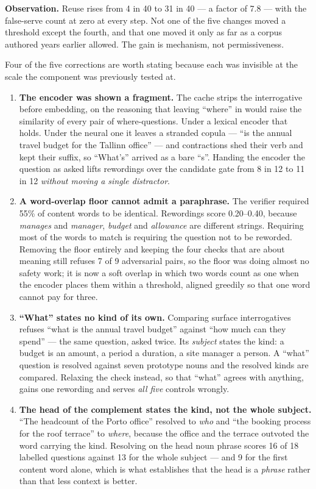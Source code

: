 \documentclass[11pt,a4paper]{article}
\newcommand{\obs}[1]{%
  \par\vspace{2pt}
  \noindent\begin{tcolorbox}[colback=soft,colframe=accent,boxrule=0pt,
    leftrule=2.2pt,arc=0pt,left=7pt,right=5pt,top=4pt,bottom=4pt,breakable]
  \small\textbf{Observation.} #1
  \end{tcolorbox}\par\vspace{2pt}}
\begin{document}
\obs{Reuse rises from 4 in 40 to 31 in 40 --- a factor of 7.8 --- with the
false-serve count at zero at every step. Not one of the five changes moved a
threshold except the fourth, and that one moved it only as far as a corpus
authored years earlier allowed. The gain is mechanism, not permissiveness.}

Four of the five corrections are worth stating because each was invisible at the
scale the component was previously tested at.

\begin{enumerate}
\item \textbf{The encoder was shown a fragment.} The cache strips the
interrogative before embedding, on the reasoning that leaving ``where'' in would
raise the similarity of every pair of where-questions. Under a lexical encoder
that holds. Under the neural one it leaves a stranded copula --- ``is the annual
travel budget for the Tallinn office'' --- and contractions shed their verb and
kept their suffix, so ``What's'' arrived as a bare ``s''. Handing the encoder the
question as asked lifts rewordings over the candidate gate from 8 in 12 to 11 in
12 \emph{without moving a single distractor}.

\item \textbf{A word-overlap floor cannot admit a paraphrase.} The verifier
required 55\% of content words to be identical. Rewordings score 0.20--0.40,
because \emph{manages} and \emph{manager}, \emph{budget} and \emph{allowance} are
different strings. Requiring most of the words to match is requiring the question
not to be reworded. Removing the floor entirely and keeping the four checks that
are about meaning still refuses 7 of 9 adversarial pairs, so the floor was doing
almost no safety work; it is now a soft overlap in which two words count as one
when the encoder places them within a threshold, aligned greedily so that one
word cannot pay for three.

\item \textbf{``What'' states no kind of its own.} Comparing surface
interrogatives refuses ``what is the annual travel budget'' against ``how much
can they spend'' --- the same question, asked twice. Its \emph{subject} states the
kind: a budget is an amount, a period a duration, a site manager a person. A
``what'' question is resolved against seven prototype nouns and the resolved
kinds are compared. Relaxing the check instead, so that ``what'' agrees with
anything, gains one rewording and serves \emph{all five} controls wrongly.

\item \textbf{The head of the complement states the kind, not the whole
subject.} ``The headcount of the Porto office'' resolved to \emph{who} and ``the
booking process for the roof terrace'' to \emph{where}, because the office and
the terrace outvoted the word carrying the kind. Resolving on the head noun
phrase scores 16 of 18 labelled questions against 13 for the whole subject --- and
9 for the first content word alone, which is what establishes that the head is a
\emph{phrase} rather than that less context is better.
\end{enumerate}
\end{document}
